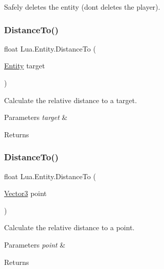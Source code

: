 Safely deletes the entity (don\textquotesingle{}t deletes the player). 

\mbox{\label{class_lua_1_1_entity_a4ec9fe7962ad6a301c33253c735aedae}} 
\subsubsection{\texorpdfstring{DistanceTo()}{DistanceTo()}\hspace{0.1cm}{\footnotesize\ttfamily [1/2]}}
{\footnotesize\ttfamily float Lua.\+Entity.\+Distance\+To (\begin{DoxyParamCaption}\item[{\mbox{\hyperlink{class_lua_1_1_entity}{Entity}}}]{target }\end{DoxyParamCaption})}



Calculate the relative distance to a target. 


\begin{DoxyParams}{Parameters}
{\em target} & \\
\hline
\end{DoxyParams}
\begin{DoxyReturn}{Returns}

\end{DoxyReturn}
\mbox{\label{class_lua_1_1_entity_ad341a3f8e110857d06111b8b6f29d646}} 
\subsubsection{\texorpdfstring{DistanceTo()}{DistanceTo()}\hspace{0.1cm}{\footnotesize\ttfamily [2/2]}}
{\footnotesize\ttfamily float Lua.\+Entity.\+Distance\+To (\begin{DoxyParamCaption}\item[{\mbox{\hyperlink{class_lua_1_1_vector3}{Vector3}}}]{point }\end{DoxyParamCaption})}



Calculate the relative distance to a point. 


\begin{DoxyParams}{Parameters}
{\em point} & \\
\hline
\end{DoxyParams}
\begin{DoxyReturn}{Returns}

\end{DoxyReturn}
\mbox{\label{class_lua_1_1_entity_af23f0b36c1b4c778fc7f328490223852}} 
